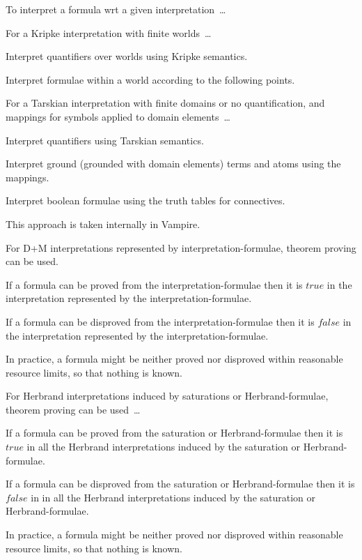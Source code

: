 \documentclass{easychair}
\newenvironment{packed_itemize}{
\vspace*{-0.2em}
\begin{itemize}
\setlength{\partopsep}{0pt}
\setlength{\itemsep}{1pt}
\setlength{\parskip}{0pt}
\setlength{\parsep}{0pt}
}{\end{itemize}}
\begin{document}
To interpret a formula wrt a given interpretation~\ldots
\begin{packed_itemize}
\item For a Kripke interpretation with finite worlds~\ldots
      \begin{packed_itemize}
      \item Interpret quantifiers over worlds using Kripke semantics.
      \item Interpret formulae within a world according to the following points.
      \end{packed_itemize}
\item For a Tarskian interpretation with finite domains or no quantification, and mappings for 
      symbols applied to domain elements~\ldots
      \begin{packed_itemize}
      \item Interpret quantifiers using Tarskian semantics.
      \item Interpret ground (grounded with domain elements) terms and atoms using the mappings.
      \item Interpret boolean formulae using the truth tables for connectives.
      \end{packed_itemize}
      This approach is taken internally in Vampire.
\item For {\sf D+M} interpretations represented by interpretation-formulae, theorem proving can 
      be used.
      \begin{packed_itemize}
      \item If a formula can be proved from the interpretation-formulae then it is $true$ in the 
            interpretation represented by the interpretation-formulae.
      \item If a formula can be disproved from the interpretation-formulae then it is $false$ in 
            the interpretation represented by the interpretation-formulae.
      \item In practice, a formula might be neither proved nor disproved within reasonable 
            resource limits, so that nothing is known.
      \end{packed_itemize}
\item For Herbrand interpretations induced by saturations or Herbrand-formulae, theorem proving 
      can be used~\ldots
      \begin{packed_itemize}
      \item If a formula can be proved from the saturation or Herbrand-formulae then it is 
            $true$ in all the Herbrand interpretations induced by the saturation or 
            Herbrand-formulae.
      \item If a formula can be disproved from the saturation or Herbrand-formulae then it is 
            $false$ in in all the Herbrand interpretations induced by the saturation or 
            Herbrand-formulae.
      \item In practice, a formula might be neither proved nor disproved within reasonable 
            resource limits, so that nothing is known.
      \end{packed_itemize}
\end{packed_itemize}
\end{document}
